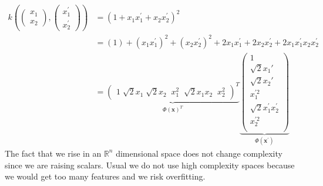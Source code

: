 \[
	\begin{aligned}
		k\left(\left(\begin{array}{l}x_1 \\ x_2\end{array}\right),\left(\begin{array}{l}x_1^{\prime} \\ x_2^{\prime}\end{array}\right)\right) & =\left(1 + x_{1}x_{1}^{\prime}+x_{2}x_{2}^{\prime}\right)^{2}                                                                                                                                                                                                                                                                                                                        \\
		                                                                                                                                      & =\left(1\right) + \left(x_{1}x_{1}^{\prime}\right)^{2}+\left(x_{2}x_{2}^{\prime}\right)^{2}+ 2x_{1}x_{1}^{\prime}+ 2x_{2}x_{2}^{\prime}+ 2 x_{1}x_{1}^{\prime}x_{2}x_{2}^{\prime}                                                                                                                                                                                                    \\
		                                                                                                                                      & =\underbrace{\left(\begin{array}{llllll}1 \; \sqrt{2}x_1 \; \sqrt{2}x_2 \;\; x_1^2 \;\; \sqrt{2}x_1 x_2 \;\; x_2^2\end{array}\right)^T}_{\Phi(\mathbf{x})^T}\underbrace{\left(\begin{array}{c}1 \\ \sqrt{2}x_1{\prime} \\ \sqrt{2}x_2{\prime} \\ x_1^{\prime 2} \\ \sqrt{2} x_1^{\prime} x_2^{\prime} \\ x_2^{\prime 2} \\\end{array}\right)}_{\Phi\left(\mathbf{x}^{\prime}\right)}
	\end{aligned}
\]
The fact that we rise in an $\mathbb{R}^{n}$ dimensional space does not change
complexity since we are raising scalars. Usual we do not use high complexity spaces
because we would get too many features and we risk overfitting.\\

